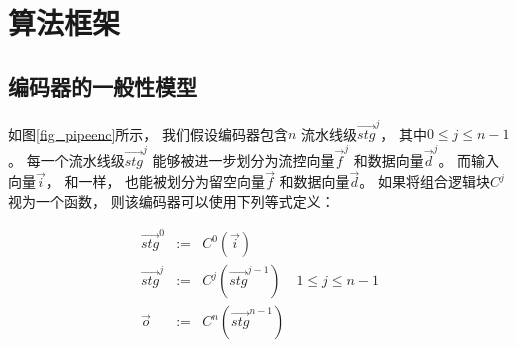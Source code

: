 %
%
%
%
%
%
%


\section{算法框架}\label{sec_framework}


\subsection{编码器的一般性模型}
如图\ref{fig_pipeenc}所示，
我们假设编码器包含$n$ 流水线级$\vec{stg}^j$，
其中$0\le j \le n-1$。
每一个流水线级$\vec{stg}^j$ 能够被进一步划分为流控向量$\vec{f}^j$ 和数据向量$\vec{d}^j$。
而输入向量$\vec{i}$，
和\cite{QinTODAES15}一样，
也能被划分为留空向量$\vec{f}$ 和数据向量$\vec{d}$。
如果将组合逻辑块$C^j$ 视为一个函数，
则该编码器可以使用下列等式定义：

\begin{equation}\label{equ_genpipe}
\begin{array}{cccc}
\vec{stg}^0   & := & C^0(\vec{i})         &\\
\vec{stg}^j   & := & C^j(\vec{stg}^{j-1}) & 1\le j\le n-1\\
\vec{o}       & := & C^n(\vec{stg}^{n-1}) &
\end{array}
\end{equation}


